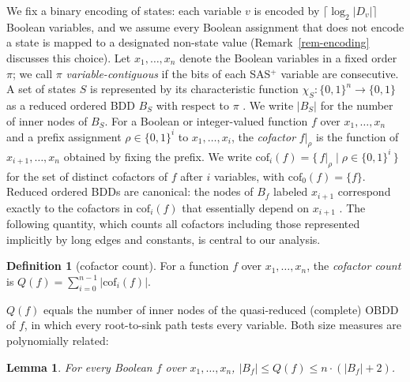 \documentclass[letterpaper]{article}
\newcommand{\bdd}[1]{\ensuremath{B_{#1}}}
\newcommand{\bddsize}[1]{\ensuremath{|B_{#1}|}}
\newcommand{\cofcount}{\ensuremath{Q}}
\newcommand{\sub}[2]{\ensuremath{\mathrm{cof}_{#1}(#2)}}
\theoremstyle{plain}
\newtheorem{lemma}{Lemma}
\theoremstyle{definition}
\newtheorem{definition}{Definition}
\theoremstyle{remark}
\begin{document}
We fix a binary encoding of states: each variable $v$ is encoded by
$\lceil \log_2 |D_v| \rceil$ Boolean variables, and we assume every
Boolean assignment that does not encode a state is mapped to a designated
non-state value (Remark~\ref{rem-encoding} discusses this choice). Let
$x_1, \dots, x_n$ denote the Boolean variables in a fixed order $\pi$; we
call $\pi$ \emph{variable-contiguous} if the bits of each SAS$^{+}$
variable are consecutive. A set of states $S$ is represented by its
characteristic function $\chi_S \colon \{0,1\}^n \to \{0,1\}$ as a
reduced ordered BDD $\bdd{S}$ with respect to $\pi$
\citep{bryant-ieeecomp1986}. We write $\bddsize{S}$ for the number of inner
nodes of $\bdd{S}$. For a Boolean or integer-valued function $f$ over
$x_1, \dots, x_n$ and a prefix assignment $\rho \in \{0,1\}^i$ to
$x_1, \dots, x_i$, the \emph{cofactor} $f|_\rho$ is the function of
$x_{i+1}, \dots, x_n$ obtained by fixing the prefix. We write
$\sub{i}{f} = \{\, f|_\rho \mid \rho \in \{0,1\}^i \,\}$ for the set of
distinct cofactors of $f$ after $i$ variables, with
$\sub{0}{f} = \{f\}$. Reduced ordered BDDs are canonical: the nodes of
$\bdd{f}$ labeled $x_{i+1}$ correspond exactly to the cofactors in
$\sub{i}{f}$ that essentially depend on $x_{i+1}$
\citep{wegener-2000}. The following quantity, which counts all cofactors
including those represented implicitly by long edges and constants, is
central to our analysis.

\begin{definition}[cofactor count]
\label{def-cofcount}
For a function $f$ over $x_1, \dots, x_n$, the \emph{cofactor count} is
$\cofcount(f) = \sum_{i=0}^{n-1} |\sub{i}{f}|$.
\end{definition}

$\cofcount(f)$ equals the number of inner nodes of the quasi-reduced
(complete) OBDD of $f$, in which every root-to-sink path tests every
variable. Both size measures are polynomially related:

\begin{lemma}
\label{lem-qsize}
For every Boolean $f$ over $x_1, \dots, x_n$,
$\bddsize{f} \leq \cofcount(f) \leq n \cdot (\bddsize{f} + 2)$.
\end{lemma}
\end{document}
